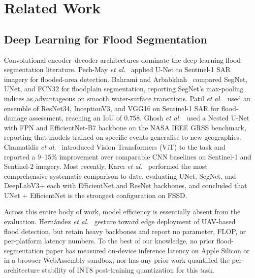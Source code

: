 
\section{Related Work}
\label{sec:related}

\subsection{Deep Learning for Flood Segmentation}
\label{sec:rw-flood}

Convolutional encoder--decoder architectures dominate the deep-learning flood-segmentation literature. Pech-May \emph{et al.}~\cite{pechmay2023flooded} applied U-Net to Sentinel-1 SAR imagery for flooded-area detection. Bahrami and Arbabkhah~\cite{bahrami2024enhanced} compared SegNet, UNet, and FCN32 for floodplain segmentation, reporting SegNet's max-pooling indices as advantageous on smooth water-surface transitions. Patil \emph{et al.}~\cite{patil2024flood} used an ensemble of ResNet34, InceptionV3, and VGG16 on Sentinel-1 SAR for flood-damage assessment, reaching an IoU of 0.758. Ghosh \emph{et al.}~\cite{ghosh2024automatic} used a Nested U-Net with FPN and EfficientNet-B7 backbone on the NASA IEEE GRSS benchmark, reporting that models trained on specific events generalise to new geographies. Chamatidis \emph{et al.}~\cite{chamatidis2024vision} introduced Vision Transformers (ViT) to the task and reported a 9--15\% improvement over comparable CNN baselines on Sentinel-1 and Sentinel-2 imagery. Most recently, Karc{\i} \emph{et al.}~\cite{karci2026deep} performed the most comprehensive systematic comparison to date, evaluating UNet, SegNet, and DeepLabV3$+$ each with EfficientNet and ResNet backbones, and concluded that UNet $+$ EfficientNet is the strongest configuration on FSSD.

Across this entire body of work, model efficiency is essentially absent from the evaluation. Hern\'andez \emph{et al.}~\cite{hernandez2022flood} gesture toward edge deployment of UAV-based flood detection, but retain heavy backbones and report no parameter, FLOP, or per-platform latency numbers. To the best of our knowledge, no prior flood-segmentation paper has measured on-device inference latency on Apple Silicon or in a browser WebAssembly sandbox, nor has any prior work quantified the per-architecture stability of INT8 post-training quantization for this task.

